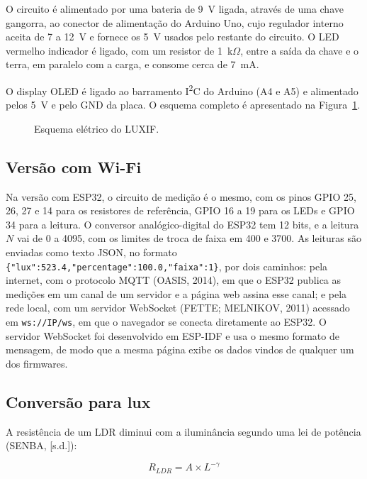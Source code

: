 \documentclass[11pt,a4paper]{article}
\begin{document}
O circuito é alimentado por uma bateria de 9~V ligada, através de uma chave gangorra, ao conector de alimentação do Arduino Uno, cujo regulador interno aceita de 7 a 12~V e fornece os 5~V usados pelo restante do circuito. O LED vermelho indicador é ligado, com um resistor de 1~k$\Omega$, entre a saída da chave e o terra, em paralelo com a carga, e consome cerca de 7~mA.

O display OLED é ligado ao barramento I\textsuperscript{2}C do Arduino (A4 e A5) e alimentado pelos 5~V e pelo GND da placa. O esquema completo é apresentado na Figura~\ref{fig:esquema}.

\begin{figure}[htbp]
	\centering
	\resizebox{0.95\textwidth}{!}{}
	\caption{Esquema elétrico do LUXIF.}
	\label{fig:esquema}
\end{figure}

\subsection*{Versão com Wi-Fi}

Na versão com ESP32, o circuito de medição é o mesmo, com os pinos GPIO 25, 26, 27 e 14 para os resistores de referência, GPIO 16 a 19 para os LEDs e GPIO 34 para a leitura. O conversor analógico-digital do ESP32 tem 12 bits, e a leitura $N$ vai de 0 a 4095, com os limites de troca de faixa em 400 e 3700. As leituras são enviadas como texto JSON, no formato \texttt{\{"lux":523.4,"percentage":100.0,"faixa":1\}}, por dois caminhos: pela internet, com o protocolo MQTT (OASIS, 2014), em que o ESP32 publica as medições em um canal de um servidor e a página web assina esse canal; e pela rede local, com um servidor WebSocket (FETTE; MELNIKOV, 2011) acessado em \texttt{ws://IP/ws}, em que o navegador se conecta diretamente ao ESP32. O servidor WebSocket foi desenvolvido em ESP-IDF e usa o mesmo formato de mensagem, de modo que a mesma página exibe os dados vindos de qualquer um dos firmwares.

\subsection*{Conversão para lux}

A resistência de um LDR diminui com a iluminância segundo uma lei de potência (SENBA, [s.d.]):

\begin{equation}
	R_{LDR} = A \times L^{-\gamma}
	\label{eq:ldr}
\end{equation}
\end{document}
